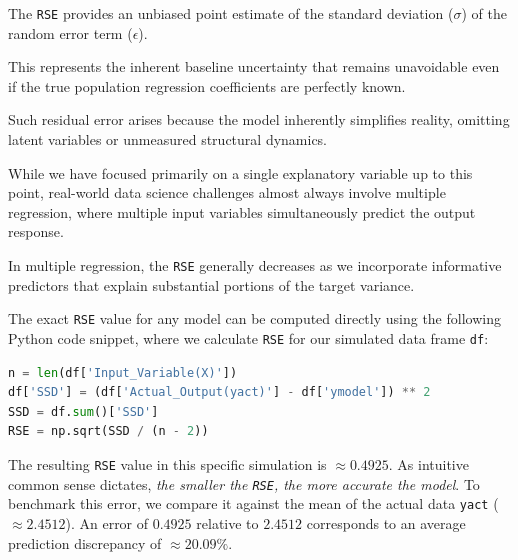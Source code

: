 The \texttt{RSE} provides an unbiased point estimate of the standard deviation ($\sigma$) of the random error term ($\epsilon$).

This represents the inherent baseline uncertainty that remains unavoidable even if the true population regression coefficients are perfectly known.

Such residual error arises because the model inherently simplifies reality, omitting latent variables or unmeasured structural dynamics.

While we have focused primarily on a single explanatory variable up to this point, real-world data science challenges almost always involve multiple regression, where multiple input variables simultaneously predict the output response.

In multiple regression, the \texttt{RSE} generally decreases as we incorporate informative predictors that explain substantial portions of the target variance.

The exact \texttt{RSE} value for any model can be computed directly using the following Python code snippet, where we calculate \texttt{RSE} for our simulated data frame \texttt{df}:

\begin{lstlisting}[language=Python]
n = len(df['Input_Variable(X)'])
df['SSD'] = (df['Actual_Output(yact)'] - df['ymodel']) ** 2
SSD = df.sum()['SSD']
RSE = np.sqrt(SSD / (n - 2))
\end{lstlisting}

The resulting \texttt{RSE} value in this specific simulation is $\approx 0.4925$. As intuitive common sense dictates, \emph{the smaller the \texttt{RSE}, the more accurate the model}. To benchmark this error, we compare it against the mean of the actual data \texttt{yact} ($\approx 2.4512$). An error of $0.4925$ relative to $2.4512$ corresponds to an average prediction discrepancy of $\approx 20.09\%$.
